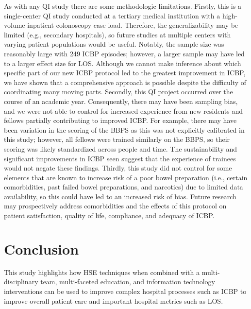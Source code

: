 \documentclass[Bprep]{subfiles}
\begin{document}
As with any QI study there are some methodologic limitations. Firstly, this is a single-center QI study conducted at a tertiary medical institution with a high-volume inpatient colonoscopy case load. Therefore, the generalizability may be limited (e.g., secondary hospitals), so future studies at multiple centers with varying patient populations would be useful. Notably, the sample size was reasonably large with 249 ICBP episodes; however, a larger sample may have led to a larger effect size for LOS. Although we cannot make inference about which specific part of our new ICBP protocol led to the greatest
improvement in ICBP, we have shown that a comprehensive approach is possible despite the difficulty of coordinating many moving parts. Secondly, this QI project occurred over the course of an academic year. Consequently, there may have been sampling bias, and we were not able to control for increased experience from new residents and fellows partially contributing to improved ICBP. For example, there may have been variation in the scoring of the BBPS as this was not explicitly calibrated in this study; however, all fellows were trained similarly on the BBPS, so their scoring was likely standardized across people and time. The sustainability and significant improvements in ICBP seen suggest that the experience of trainees would not negate these findings. Thirdly, this study did not control for some elements that are known to increase risk of a poor bowel preparation (i.e., certain comorbidities, past failed bowel preparations, and narcotics) due to limited data availability, so this could have led to an increased risk of bias. Future research may prospectively address comorbidities and the effects of this protocol on patient satisfaction, quality of life, compliance, and adequacy of ICBP.\\



\section{Conclusion}\label{subsec:Conclusion}
\hypertarget{Conclusion}{}

This study highlights how HSE techniques when combined with a multi-disciplinary team, multi-faceted education, and information technology interventions can be used to improve complex hospital processes such as ICBP to improve overall patient care and important hospital metrics such as LOS.\\
\end{document}
